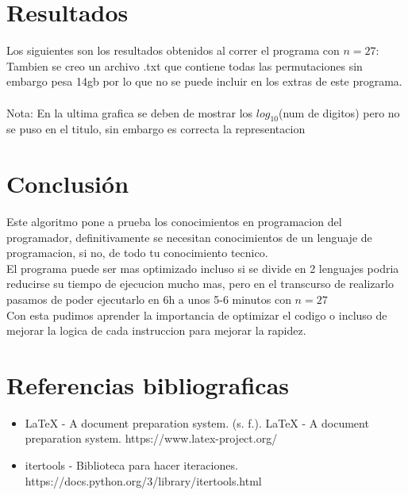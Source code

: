 \documentclass{article}
\begin{document}
\section{Resultados}

Los siguientes son los resultados obtenidos al correr el programa con $n = 27$:
Tambien se creo un archivo .txt que contiene todas las permutaciones sin embargo pesa 14gb por lo que no se puede incluir en los extras de este programa.\\
\\Nota: En la ultima grafica se deben de mostrar los $log_{10}$(num de digitos) pero no se puso en el titulo, sin embargo es correcta la representacion

\section{Conclusión}
Este algoritmo pone a prueba los conocimientos en programacion del programador, definitivamente se necesitan conocimientos de un lenguaje de programacion, si no, de todo tu conocimiento tecnico.
\\El programa puede ser mas optimizado incluso si se divide en 2 lenguajes podria reducirse su tiempo de ejecucion mucho mas, pero en el transcurso de realizarlo pasamos de poder ejecutarlo en 6h a unos 5-6 minutos con $n=27$
\\Con esta pudimos aprender la importancia de optimizar el codigo o incluso de mejorar la logica de cada instruccion para mejorar la rapidez.

\section{Referencias bibliograficas}
\begin{itemize}
    \item LaTeX - A document preparation system. (s. f.). LaTeX - A document preparation system. https://www.latex-project.org/
    \item itertools - Biblioteca para hacer iteraciones. https://docs.python.org/3/library/itertools.html
\end{itemize}
\end{document}
